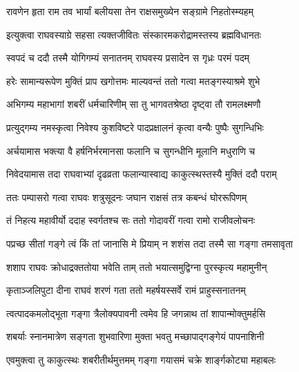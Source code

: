 
\twolineshloka
{रावणेन हृता राम तव भार्यां बलीयसा}
{तेन राक्षसमुख्येन सङ्ग्रामे निहतोस्म्यहम्}%


\twolineshloka
{इत्युक्त्वा राघवस्याग्रे सहसा त्यक्तजीवितः}
{संस्कारमकरोद्रामस्तस्य ब्रह्मविधानतः}%

\twolineshloka
{स्वपदं च ददौ तस्मै योगिगम्यं सनातनम्}
{राघवस्य प्रसादेन स गृध्रः परमं पदम्}%

\twolineshloka
{हरेः सामान्यरूपेण मुक्तिं प्राप खगोत्तमः}
{माल्यवन्तं ततो गत्वा मतङ्गस्याश्रमे शुभे}%

\twolineshloka
{अभिगम्य महाभागां शबरीं धर्मचारिणीम्}
{सा तु भागवतश्रेष्ठा दृष्ट्वा तौ रामलक्ष्मणौ}%

\twolineshloka
{प्रत्युद्गम्य नमस्कृत्वा निवेश्य कुशविष्टरे}
{पादप्रक्षालनं कृत्वा वन्यैः पुष्पैः सुगन्धिभिः}%

\twolineshloka
{अर्चयामास भक्त्या वै हर्षनिर्भरमानसा}
{फलानि च सुगन्धीनि मूलानि मधुराणि च}%

\twolineshloka
{निवेदयामास तदा राघवाभ्यां दृढव्रता}
{फलान्यास्वाद्य काकुत्स्थस्तस्यै मुक्तिं ददौ पराम्}%

\twolineshloka
{ततः पम्पासरो गत्वा राघवः शत्रुसूदनः}
{जघान राक्षसं तत्र कबन्धं घोररूपिणम्}%

\twolineshloka
{तं निहत्य महावीर्यो ददाह स्वर्गतश्च सः}
{ततो गोदावरीं गत्वा रामो राजीवलोचनः}%

\twolineshloka
{पप्रच्छ सीतां गङ्गे त्वं किं तां जानासि मे प्रियाम्}
{न शशंस तदा तस्मै सा गङ्गा तमसावृता}%

\twolineshloka
{शशाप राघवः क्रोधाद्रक्ततोया भवेति ताम्}
{ततो भयात्समुद्विग्ना पुरस्कृत्य महामुनीन्}%

\twolineshloka
{कृताञ्जलिपुटा दीना राघवं शरणं गता}
{ततो महर्षयस्सर्वे रामं प्राहुस्सनातनम्}%


\twolineshloka
{त्वत्पादकमलोद्भूता गङ्गा त्रैलोक्यपावनी}
{त्वमेव हि जगन्नाथ तां शापान्मोक्तुमर्हसि}%




\twolineshloka
{शबर्याः स्नानमात्रेण सङ्गता शुभवारिणा}
{मुक्ता भवतु मच्छापाद्गङ्गेयं पापनाशिनी}%

\twolineshloka
{एवमुक्त्वा तु काकुत्स्थः शबरीतीर्थमुत्तमम्}
{गङ्गा गयासमं चक्रे शार्ङ्गकोट्या महाबलः}%

